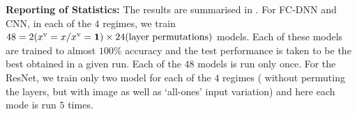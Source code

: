 \textbf{Reporting of Statistics:} The results are summarised in . For FC-DNN and CNN, in each of the $4$ regimes, we train $48= 2 (x^{\text{v}}=x / x^{\text{v}}=\mathbf{1}) \times 24(\text{layer permutations})$ models. Each of these models are trained to almost $100\%$ accuracy and the test performance is taken to be the best obtained in a given run. Each of the $48$ models is run only once. For the ResNet, we train only two model for each of the $4$ regimes ( without permuting the layers, but with image as well as `all-ones' input variation) and here each mode is run $5$ times. %

